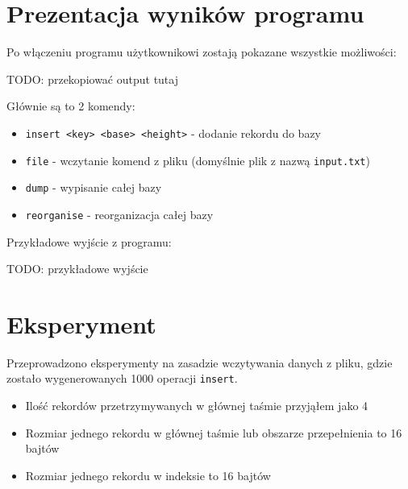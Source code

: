 \documentclass[
]{article}
\providecommand{\tightlist}{%
  \setlength{\itemsep}{0pt}\setlength{\parskip}{0pt}}
\begin{document}
\section{Prezentacja wyników
programu}\label{prezentacja-wynikuxf3w-programu}

Po włączeniu programu użytkownikowi zostają pokazane wszystkie
możliwości:

TODO: przekopiować output tutaj

Głównie są to 2 komendy:

\begin{itemize}
\tightlist
\item
  \texttt{insert\ \textless{}key\textgreater{}\ \textless{}base\textgreater{}\ \textless{}height\textgreater{}}
  - dodanie rekordu do bazy
\item
  \texttt{file} - wczytanie komend z pliku (domyślnie plik z nazwą
  \texttt{input.txt})
\item
  \texttt{dump} - wypisanie całej bazy
\item
  \texttt{reorganise} - reorganizacja całej bazy
\end{itemize}

Przykładowe wyjście z programu:

TODO: przykładowe wyjście

\section{Eksperyment}\label{eksperyment}

Przeprowadzono eksperymenty na zasadzie wczytywania danych z pliku,
gdzie zostało wygenerowanych 1000 operacji \texttt{insert}.

\begin{itemize}
\tightlist
\item
  Ilość rekordów przetrzymywanych w głównej taśmie przyjąłem jako 4
\item
  Rozmiar jednego rekordu w głównej taśmie lub obszarze przepełnienia to
  16 bajtów
\item
  Rozmiar jednego rekordu w indeksie to 16 bajtów
\end{itemize}
\end{document}
